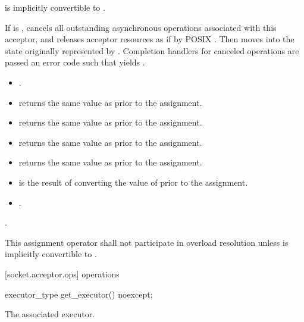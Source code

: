\begin{itemdescr}
\pnum
\requires {} is implicitly convertible to .

\pnum
\effects If  is , cancels all outstanding asynchronous operations associated with this acceptor, and releases acceptor resources as if by POSIX . Then moves into  the state originally represented by . Completion handlers for canceled operations are passed an error code  such that  yields .

\pnum
\postconditions 
\begin{itemize}
\item
{}.
\item
{} returns the same value as  prior to the assignment.
\item
{} returns the same value as  prior to the assignment.
\item
{} returns the same value as  prior to the assignment.
\item
{} returns the same value as  prior to the assignment.
\item
{} is the result of converting the value of  prior to the assignment.
\item
{}.
\end{itemize}

\pnum
\returns {}.

\pnum
\remarks This assignment operator shall not participate in overload resolution unless  is implicitly convertible to .
\end{itemdescr}



[socket.acceptor.ops]{ operations}

\begin{itemdecl}
executor_type get_executor() noexcept;
\end{itemdecl}

\begin{itemdescr}
\pnum
\returns The associated executor.
\end{itemdescr}


